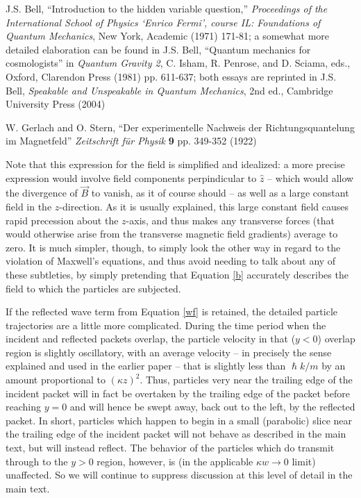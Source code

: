 \documentclass[aps,prc,onecolumn,letterpaper,floatfix,12pt]{revtex4}
\renewcommand{\hbar}{\hslash}
\begin{document}
\begin{thebibliography}{99}
 J.S. Bell, ``Introduction to the hidden variable
  question,''  \emph{Proceedings of the International School of
    Physics `Enrico Fermi', course IL: Foundations of Quantum
    Mechanics}, New York, Academic (1971) 171-81; a somewhat more
  detailed elaboration can be found in J.S. Bell, ``Quantum mechanics
  for cosmologists'' in \emph{Quantum Gravity 2}, C. Isham,
  R. Penrose, and D. Sciama, eds., Oxford, Clarendon Press (1981)
  pp. 611-637; both essays are reprinted in J.S. Bell, \emph{Speakable
    and Unspeakable in Quantum Mechanics}, 2nd ed., Cambridge
  University Press (2004)


 W. Gerlach and O. Stern, ``Der experimentelle Nachweis
  der Richtungsquantelung im Magnetfeld'' \emph{Zeitschrift f\"ur
    Physik} {\bf{9}} pp. 349-352 (1922)



  Note that this expression for the field is simplified
and idealized:  a more precise expression would
involve field components perpindicular to $\hat{z}$ -- which would
allow the divergence of $\vec{B}$ to vanish, as it of course should 
-- as well as a large
constant field in the $z$-direction.  As it is usually explained, this
large constant field causes rapid precession about the $z$-axis, and
thus makes any transverse forces (that would otherwise arise from the
transverse magnetic field gradients) average to zero.  It is much
simpler, though, to simply look the other way in regard to the
violation of Maxwell's equations, and thus avoid needing to talk about
any of these subtleties, by simply pretending that Equation \eqref{b}
accurately describes the field to which the particles are subjected.

If the reflected wave term from Equation \eqref{wf} is retained, the
detailed particle trajectories are a little more complicated.  
During the time period when the incident and reflected
packets overlap, the particle velocity in that ($y<0$) overlap region
is slightly oscillatory, with an average velocity -- in precisely the
sense explained and used in the earlier paper -- that is slightly less than
$\hbar k / m$ by an amount proportional to $(\kappa z)^2$.  Thus,
particles very near the trailing edge of the incident packet will in
fact be overtaken by the trailing edge of the packet before reaching
$y=0$ and will hence be swept away, back out to the left, by the
reflected packet.  In short, particles which happen to begin in a
small (parabolic) slice near the trailing edge of the incident packet
will not behave as described in the main text, but will instead
reflect.  The behavior of the particles which do transmit through to
the $y>0$ region, however, is (in the applicable $\kappa w \rightarrow
0$ limit) unaffected.  So we will continue to suppress discussion at
this level of detail in the main text.  



\end{thebibliography}
\end{document}

